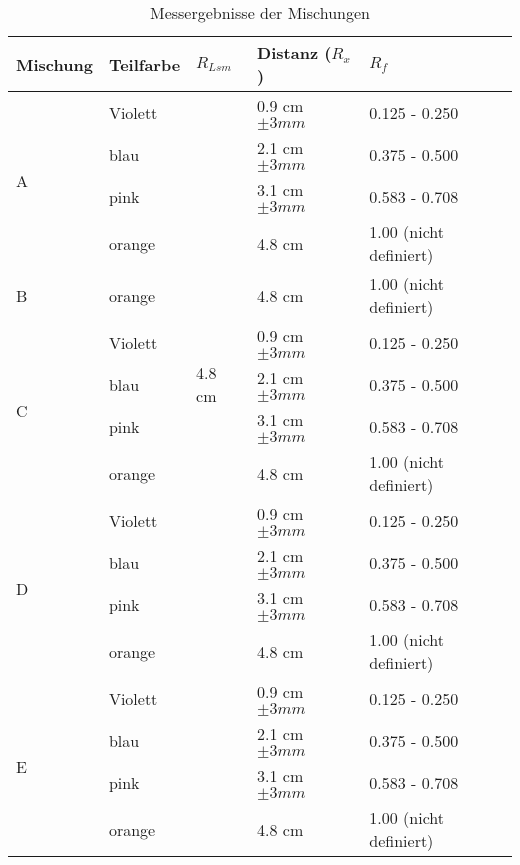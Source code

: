 \documentclass[11pt,paper=a4,final]{scrartcl}
\begin{document}
\begin{savenotes}
  \begin{table}[ht]
    \centering
    \begin{tabular}{|l|l|l|l|l|}
      \hline
      \bf Mischung	& \bf Teilfarbe	& \bf \(R_{Lsm}\)		& \bf Distanz (\(R_x\))	& \(R_f\)		\\ \hline
      \multirow{4}{*}{A}
			& Violett	& \multirow{13}{*}{4.8 cm }	& 0.9 cm \(\pm 3 mm \)	& 0.125 - 0.250		\\
      			& blau		& 				& 2.1 cm \(\pm 3 mm \)	& 0.375 - 0.500		\\
      			& pink		&				& 3.1 cm \(\pm 3 mm \)	& 0.583 - 0.708		\\
      			& orange	&				& 4.8 cm 		& 1.00 (nicht definiert)\\ \cline{1-2} \cline{4-5}
       B		& orange	&				& 4.8 cm		& 1.00 (nicht definiert)\\ \cline{1-2} \cline{4-5}
      \multirow{4}{*}{C}
			& Violett	& 				& 0.9 cm \(\pm 3 mm \)	& 0.125 - 0.250		\\
      			& blau		& 				& 2.1 cm \(\pm 3 mm \)	& 0.375 - 0.500		\\
      			& pink		&				& 3.1 cm \(\pm 3 mm \)	& 0.583 - 0.708		\\
      			& orange	&				& 4.8 cm 		& 1.00 (nicht definiert)\\ \cline{1-2} \cline{4-5}
      \multirow{4}{*}{D}
			& Violett	&				& 0.9 cm \(\pm 3 mm \)	& 0.125 - 0.250		\\
      			& blau		& 				& 2.1 cm \(\pm 3 mm \)	& 0.375 - 0.500		\\
      			& pink		&				& 3.1 cm \(\pm 3 mm \)	& 0.583 - 0.708		\\
      			& orange	&				& 4.8 cm 		& 1.00 (nicht definiert)\\ \hline
      \multirow{4}{*}{E}
			& Violett	&				& 0.9 cm \(\pm 3 mm \)	& 0.125 - 0.250		\\
      			& blau		& 				& 2.1 cm \(\pm 3 mm \)	& 0.375 - 0.500		\\
      			& pink		&				& 3.1 cm \(\pm 3 mm \)	& 0.583 - 0.708		\\
      			& orange	&				& 4.8 cm 		& 1.00 (nicht definiert)\\ \hline

    \end{tabular}
    \caption{Messergebnisse der Mischungen}
  \end{table}
\end{savenotes}
\end{document}
